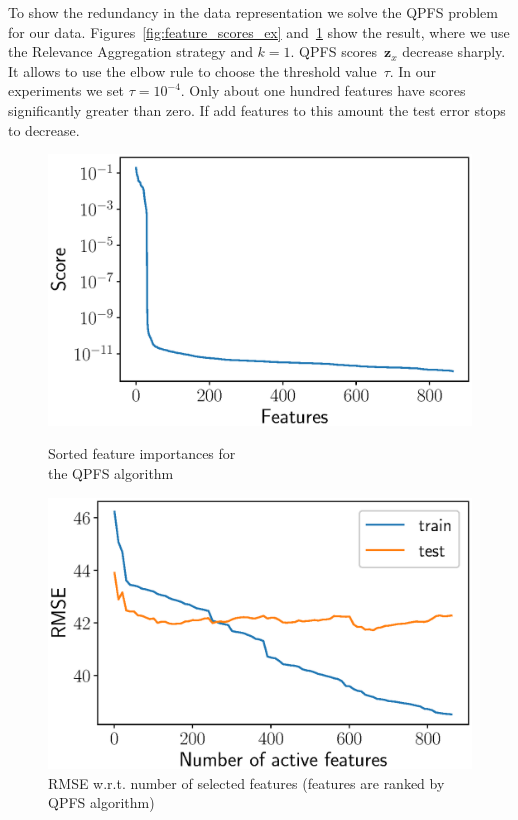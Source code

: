 \documentclass[12pt,oneside]{article}
\theoremstyle{definition}
\newcommand{\bz}{\mathbf{z}}
\begin{document}
To show the redundancy in the data representation we solve the QPFS problem for our data.
Figures~\ref{fig:feature_scores_ex} and~\ref{fig:train_test_qpfs} show the result, where we use the Relevance Aggregation strategy and $k = 1$.
QPFS scores~$\bz_x$ decrease sharply.
It allows to use the elbow rule to choose the threshold value~$\tau$. 
In our experiments we set $\tau = 10^{-4}$. 
Only about one hundred features have scores significantly greater than zero.
If add features to this amount the test error stops to decrease.
\begin{figure}[h]
	\begin{minipage}{.5\linewidth}
		\centering
		\includegraphics[width=\linewidth]{figs/feature_scores_ex.eps}
		\caption{Sorted feature importances for \\ the QPFS algorithm}
		\label{fig:feature_scores_ex}
	\end{minipage}%
	\begin{minipage}{.5\linewidth}
	\centering
	\includegraphics[width=\linewidth]{figs/train_test_qpfs.eps}
	\caption{RMSE w.r.t. number of selected features (features are ranked by QPFS algorithm)}
	\label{fig:train_test_qpfs}
	\end{minipage}
\end{figure}
\end{document}
